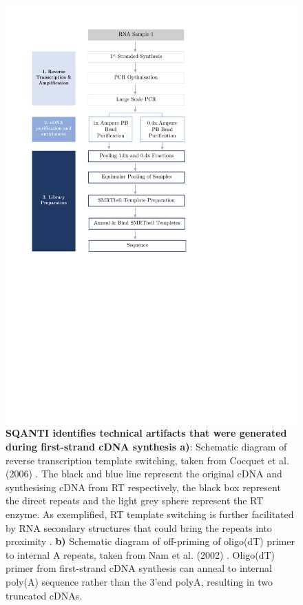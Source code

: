 \begin{figure}[h]
	\begin{center}
		\includegraphics[page=4,trim={2cm 21cm 0 1cm},clip, scale = 1]{Figures/ProjectDevelopment_Figures.pdf}
	\end{center}
	\captionsetup{width=0.95\textwidth}
	\caption[Technical artifacts generated during library preparation and identified in SQANTI]%
	{\textbf{SQANTI identifies technical artifacts that were generated during first-strand cDNA synthesis a)}: Schematic diagram of reverse transcription template switching, taken from Cocquet et al.(2006) \cite{Cocquet2006}. The black and blue line represent the original cDNA and synthesising cDNA from RT respectively, the black box represent the direct repeats and the light grey sphere represent the RT enzyme. As exemplified, RT template switching is further facilitated by RNA secondary structures that could bring the repeats into proximity \cite{Cocquet2006}. \textbf{b)} Schematic diagram of off-priming of oligo(dT) primer to internal A repeats, taken from Nam et al. (2002) \cite{Nam2002}. Oligo(dT) primer from first-strand cDNA synthesis can anneal to internal poly(A) sequence rather than the 3'end polyA, resulting in two truncated cDNAs.}
	\label{fig:lib_prep_artifacts}
\end{figure}

